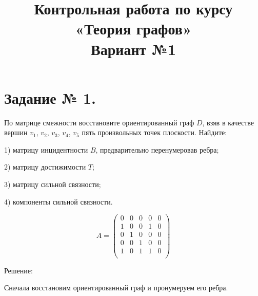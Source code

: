 \documentclass[fleqn]{article}
\title{Контрольная работа по курсу «Теория графов»\\
Вариант №1}
\begin{document}
\date{}
\maketitle
\section*{Задание № 1.}

По матрице смежности восстановите ориентированный граф $D$,
взяв в качестве вершин $v_1$, $v_2$, $v_3$, $v_4$, $v_5$ пять произвольных точек плоскости. Найдите:

1) матрицу инцидентности $B$, предварительно перенумеровав ребра;

2) матрицу достижимости $T$;

3) матрицу сильной связности;

4) компоненты сильной связности.

$$A = \begin{pmatrix}
0 & 0 & 0 & 0 & 0 \\
1 & 0 & 0 & 1 & 0 \\
0 & 1 & 0 & 0 & 0 \\
0 & 0 & 1 & 0 & 0 \\
1 & 0 & 1 & 1 & 0 \\
\end{pmatrix}
$$

\begin{center}Решение:\end{center}

Сначала восстановим ориентированный граф и пронумеруем его ребра.

\medskip

\end{document}
